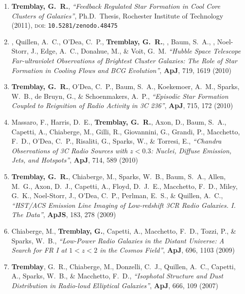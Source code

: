 \documentclass[11pt]{article}
\begin{document}
\begin{enumerate}
\item \textbf{Tremblay, G.~R.}, \textit{``Feedback Regulated Star Formation in Cool Core
Clusters of Galaxies''}, Ph.D.~Thesis, Rochester Institute of Technology (2011), \textsc{doi}: \texttt{10.5281/zenodo.48475}



\item {}, Quillen, A.~C., O'Dea, C.~P., \textbf{Tremblay, G.~R.}, , Baum, S.~A., , Noel-Storr, J., Edge, A.~C., Donahue,
M., \& Voit, G.~M.  \textit{``Hubble Space Telescope Far-ultraviolet Observations of Brightest Cluster Galaxies: The Role of Star Formation in Cooling Flows and BCG Evolution''}, \textbf{ApJ}, 719,  1619 (2010)



\item \textbf{Tremblay, G.~R.}, O'Dea, C.~P., Baum, S.~A., Koekemoer, A.~M., Sparks,
W.~B., de Bruyn, G.,
\& Schoenmakers, A.~P.,  \textit{``Episodic Star Formation Coupled to Reignition of Radio Activity in 3C 236''}, \textbf{ApJ}, 715,  172 (2010)




\item Massaro, F.,  Harris, D.~E., \textbf{Tremblay, G.~R.}, Axon, D.,
Baum, S.~A., Capetti, A., Chiaberge, M., Gilli, R.,
Giovannini, G., Grandi, P., Macchetto, F.~D., O'Dea, C.~P., Risaliti, G.,
Sparks, W.,
\& Torresi, E., \textit{``Chandra Observations of 3C Radio Sources with $z < 0.3$: Nuclei, Diffuse Emission, Jets, and Hotspots''}, \textbf{ApJ}, 714,  589 (2010)




\item \textbf{Tremblay, G.~R.}, Chiaberge, M., Sparks, W.~B., Baum, S.~A., Allen,
M.~G., Axon, D.~J., Capetti, A., Floyd, D.~J.~E., Macchetto, F.~D., Miley,
G.~K., Noel-Storr, J., O'Dea, C.~P., Perlman, E.~S.,
\& Quillen, A.~C.,  \textit{``HST/ACS Emission Line Imaging of Low-redshift 3CR Radio Galaxies. I. The Data''}, \textbf{ApJS}, 183,  278 (2009)



\item Chiaberge, M., \textbf{Tremblay, G.}, Capetti, A., Macchetto, F.~D., Tozzi, P.,
\& Sparks, W.~B.,  \textit{``Low-Power Radio Galaxies in the Distant Universe: A Search for FR I at $1< z < 2$ in the Cosmos Field''}, \textbf{ApJ}, 696,  1103 (2009)



\item \textbf{Tremblay}, G.~R., Chiaberge, M., Donzelli, C.~J., Quillen, A.~C.,
Capetti, A., Sparks, W.~B.,
\& Macchetto, F.~D., \textit{``Isophotal Structure and Dust Distribution in Radio-loud Elliptical Galaxies''}, \textbf{ApJ}, 666,  109 (2007)


\end{enumerate}
\end{document}
